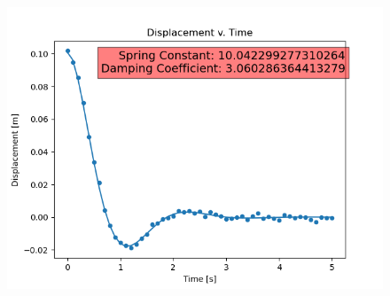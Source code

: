 \documentclass[]{report}
\begin{document}
	
			\begin{figure}[h]
		\centering
		\includegraphics[width=0.7\linewidth]{pics/3}
		\label{fig:3}
	\end{figure}
	
\end{document}

